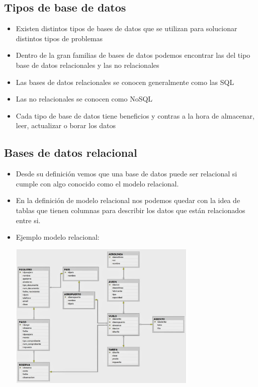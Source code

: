 \documentclass[%
 reprint,
 amsmath,amssymb,
 aps,
]{revtex4-1}
\begin{document}
\subsection{Tipos de base de datos}
	          \begin{itemize}
		\item Existen distintos tipos de bases de datos que se utilizan para solucionar distintos tipos de problemas
                     \item Dentro de la gran familias de bases de datos podemos encontrar las del tipo base de datos relacionales y las no relacionales
		\item Las bases de datos relacionales se conocen generalmente como las SQL
		\item Las no relacionales se conocen como NoSQL
		\item Cada tipo de base de datos tiene beneficios y contras a la hora de almacenar, leer, actualizar o borar los datos
	           \end{itemize}
\subsection{Bases de datos relacional}
	          \begin{itemize}
		\item Desde su definición vemos que una base de datos puede ser relacional si cumple con algo conocido como el modelo relacional.
                     \item En la definición de modelo relacional nos podemos quedar con la idea de tablas que tienen columnas para describir los datos que están relacionados entre si.
		\item Ejemplo modelo relacional:
                     \begin{center}
		\includegraphics[width=9cm]{./Imagenes/1}
		\end{center}	
	          \end{itemize}
\end{document}

